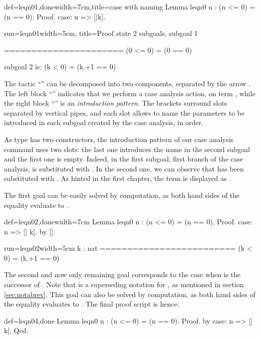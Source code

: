 \begin{coq}{def=leqn01,done}{width=7cm,title=case with naming}
Lemma leqn0 n : (n <= 0) = (n == 0).
Proof.
case: n => [|k].
\end{coq}
\begin{coqout}{run=leqn01}{width=5cm, title=Proof state}
2 subgoals, subgoal 1

======================
  (0 <= 0) = (0 == 0)

subgoal 2 is:
 (k < 0) = (k.+1 == 0)
\end{coqout}
The tactic ``''  can be decomposed into two components,
separated by the arrow \C{=>}.  The left block ``'' indicates
that we  perform a case analysis action, on term , while the right
block ``\C{[|k]}'' is an \emph{introduction pattern}. The brackets
surround slots separated by vertical pipes, and each slot allows to
name the parameters to be introduced in each subgoal created by the
case analysis, in order.

As type  has two constructors, the introduction pattern \C{[|k]}
of our case analysis command uses two slots: the last one introduces
the name  in the second subgoal and the first one is
empty. Indeed, in the first subgoal, first branch of the case
analysis,  is substituted with . In the second one, we can
observe that  has been substituted with .
As hinted in the first chapter, the term 
is displayed as .

The first goal
can be easily solved by computation, as both hand sides of the equality
evaluate to .

\begin{coq}{def=leqn02,done}{width=7cm}
Lemma leqn0 n : (n <= 0) = (n == 0).
Proof.
case: n => [| k].
  by [].
\end{coq}
\begin{coqout}{run=leqn02}{width=5cm}
k : nat
=========================
  (k < 0) = (k.+1 == 0)
\end{coqout}
The second and now only remaining goal corresponds to the case when
 is the successor of . Note that  is a
superseding notation for , as mentioned in section
\ref{sec:notabrev}. This goal can also be  solved by computation, as
both hand sides of the equality evaluates to .  The final
proof script is hence:

\begin{coq}{def=leqn04,done}{}
Lemma leqn0 n : (n <= 0) = (n == 0).
Proof.  by case: n => [| k].  Qed.
\end{coq}
~\\

